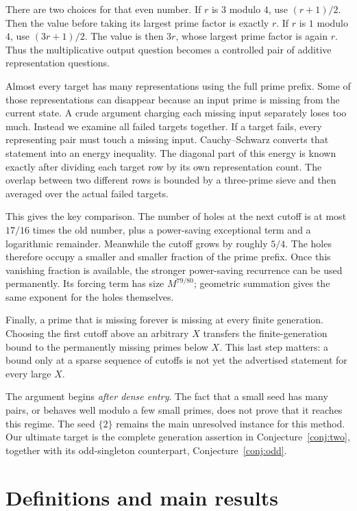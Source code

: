 \documentclass[11pt]{article}
\theoremstyle{definition}
\theoremstyle{remark}
\begin{document}
There are two choices for that even number. If \(r\) is \(3\) modulo \(4\),
use \((r+1)/2\). Then the value before taking its largest prime factor is
exactly \(r\). If \(r\) is \(1\) modulo \(4\), use \((3r+1)/2\). The value
is then \(3r\), whose largest prime factor is again \(r\). Thus the
multiplicative output question becomes a controlled pair of additive
representation questions.

Almost every target has many representations using the full prime prefix.
Some of those representations can disappear because an input prime is
missing from the current state. A crude argument charging each missing
input separately loses too much. Instead we examine all failed targets
together. If a target fails, every representing pair must touch a missing
input. Cauchy--Schwarz converts that statement into an energy inequality.
The diagonal part of this energy is known exactly after dividing each
target row by its own representation count. The overlap between two
different rows is bounded by a three-prime sieve and then averaged over
the actual failed targets.

This gives the key comparison. The number of holes at the next cutoff is
at most \(17/16\) times the old number, plus a power-saving exceptional
term and a logarithmic remainder. Meanwhile the cutoff grows by roughly
\(5/4\). The holes therefore occupy a smaller and smaller fraction of the
prime prefix. Once this vanishing fraction is available, the stronger
power-saving recurrence can be used permanently. Its forcing term has
size \(M^{79/80}\); geometric summation gives the same exponent for the
holes themselves.

Finally, a prime that is missing forever is missing at every finite
generation. Choosing the first cutoff above an arbitrary \(X\) transfers
the finite-generation bound to the permanently missing primes below
\(X\). This last step matters: a bound only at a sparse sequence of
cutoffs is not yet the advertised statement for every large \(X\).

The argument begins \emph{after dense entry}. The fact that a small seed
has many pairs, or behaves well modulo a few small primes, does not prove
that it reaches this regime. The seed \(\{2\}\) remains the main unresolved
instance for this method. Our ultimate target is the complete generation
assertion in Conjecture~\ref{conj:two}, together with its odd-singleton
counterpart, Conjecture~\ref{conj:odd}.

\section{Definitions and main results}
\end{document}
